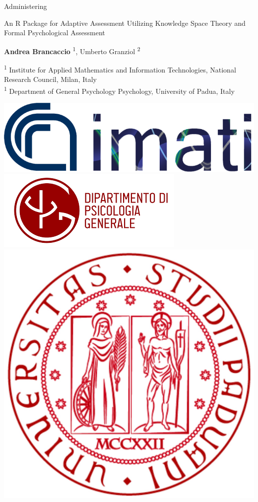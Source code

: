 \documentclass{beamer}
\begin{document}
\begin{frame}{Administering}
	\begin{center}
		\begin{Large}
	An R Package for Adaptive Assessment Utilizing Knowledge Space Theory and Formal Psychological Assessment
		\end{Large}
		
		
		\vspace{5mm}
\textbf{Andrea Brancaccio} \textsuperscript{1}, Umberto Granziol \textsuperscript{2}

		\small
		\vspace{3mm}
		\textsuperscript{1} Institute for Applied Mathematics and Information Technologies, National Research Council, Milan, Italy \\
		\textsuperscript{1}	Department of General Psychology Psychology, University of Padua, Italy
		
	\end{center}
	
	\centering
	\includegraphics[width=.30\linewidth]{img/IMATI_logo} \hspace{8mm}
	\includegraphics[width=.30\linewidth]{img/dpg} \hspace{5mm}  \includegraphics[width=.15\linewidth]{img/logoUnipd}
	
\end{frame}
\end{document}
